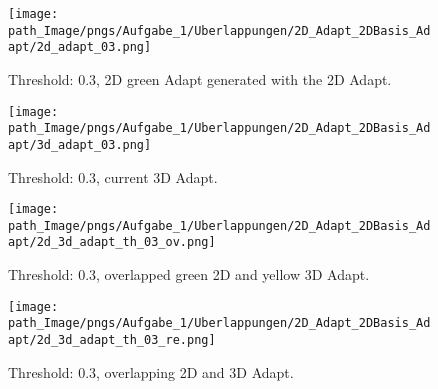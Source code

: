 %
%
%
\begin{figure}[!h]
\begin{minipage}{0.45\textwidth}
  \texttt{[image: path\_Image/pngs/Aufgabe\_1/Uberlappungen/2D\_Adapt\_2DBasis\_Adapt/2d\_adapt\_03.png]}
  \vspace*{-10mm}
	\caption{Threshold: 0.3, 2D green Adapt generated with the 2D Adapt.} 
	\label{fig_2dadapt_03}
\end{minipage}
\hfill
\begin{minipage}{0.45\textwidth}
  \texttt{[image: path\_Image/pngs/Aufgabe\_1/Uberlappungen/2D\_Adapt\_2DBasis\_Adapt/3d\_adapt\_03.png]}
    \vspace*{-10mm}
	\caption{Threshold: 0.3, current 3D Adapt.}
	\label{fig_3dbadapt_03}
\end{minipage}
\end{figure}
\begin{figure} [H]
\begin{minipage}{0.45\textwidth}
  \texttt{[image: path\_Image/pngs/Aufgabe\_1/Uberlappungen/2D\_Adapt\_2DBasis\_Adapt/2d\_3d\_adapt\_th\_03\_ov.png]}
    \vspace*{-10mm}
	\caption{Threshold: 0.3, overlapped green 2D and yellow 3D Adapt.} 
	\label{fig_3dadapt_overl_03}
\end{minipage}
\hfill
\begin{minipage}{0.45\textwidth}
  \texttt{[image: path\_Image/pngs/Aufgabe\_1/Uberlappungen/2D\_Adapt\_2DBasis\_Adapt/2d\_3d\_adapt\_th\_03\_re.png]}
    \vspace*{-10mm}
	\caption{Threshold: 0.3, overlapping 2D and 3D Adapt.} 
	\label{fig_3dadapt_re_03}
	\end{minipage}
\end{figure}

